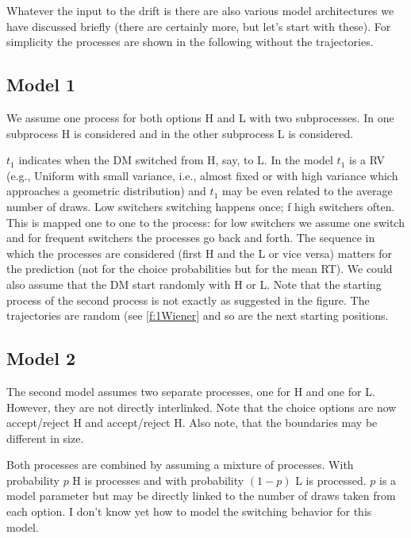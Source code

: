 \documentclass[english,doc]{apa}
\begin{document}
 
Whatever the input to the drift is there are also various model architectures we have  discussed briefly (there are certainly more, but let's start with these). For simplicity the processes are shown in the following without the trajectories.  


\subsection{Model 1}
\noindent We assume one process for both options H and L with two subprocesses. In one subprocess H is considered and in the other subprocess L is considered. 


\noindent $t_1$ indicates when the DM switched from H, say, to L.  In the model $t_1$ is a RV (e.g., Uniform with small variance, i.e., almost fixed or with high variance which approaches a geometric distribution) and $t_1$ may be even related to the average number of draws. Low switchers switching happens once; f high switchers often. This is mapped one to one to the process: for low switchers we assume one switch and for frequent switchers the processes go back and forth. The sequence in which the processes are considered (first H and the L or vice versa) matters for the prediction (not for the choice probabilities but for the mean RT). We could also assume that the DM start randomly with H or L. Note that the starting process of the second process is not exactly as suggested in the figure. The trajectories are random (see \ref{f:1Wiener} and so are the next starting positions. 

\subsection{Model 2}
\noindent The second model assumes two separate processes, one for H and one for L. However, they are not directly interlinked. Note that the choice options are now accept/reject H and accept/reject H.  Also note, that the boundaries may be different in size. 

Both processes are combined by assuming a mixture of processes. With probability $p$  H is processes and with probability $(1-p)$ L is processed. $p$ is a model parameter but may be directly linked to the number of draws taken from each option. I don't know yet how to model the switching behavior for this model. 
\end{document}

